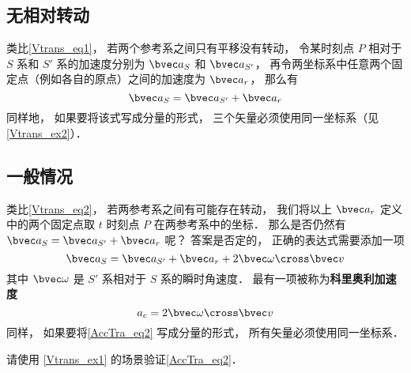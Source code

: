 

\subsection{无相对转动}
类比\autoref{Vtrans_eq1}， 若两个参考系之间只有平移没有转动， 令某时刻点 $P$ 相对于 $S$ 系和 $S'$ 系的加速度分别为 $\bvec a_S$ 和 $\bvec a_{S'}$， 再令两坐标系中任意两个固定点（例如各自的原点）之间的加速度为 $\bvec a_r$， 那么有
\begin{equation}\label{AccTra_eq1}
\bvec a_S = \bvec a_{S'} + \bvec a_r
\end{equation}
同样地， 如果要将该式写成分量的形式， 三个矢量必须使用同一坐标系（见\autoref{Vtrans_ex2}）．

\subsection{一般情况}
类比\autoref{Vtrans_eq2}， 若两参考系之间有可能存在转动， 我们将以上 $\bvec a_r$ 定义中的两个固定点取 $t$ 时刻点 $P$ 在两参考系中的坐标． 那么是否仍然有 $\bvec a_S = \bvec a_{S'} + \bvec a_r$ 呢？ 答案是否定的， 正确的表达式需要添加一项
\begin{equation}\label{AccTra_eq2}
\bvec a_S = \bvec a_{S'} + \bvec a_r + 2 \bvec \omega \cross \bvec v
\end{equation}
其中 $\bvec \omega$ 是 $S'$ 系相对于 $S$ 系的瞬时角速度． 最有一项被称为\textbf{科里奥利加速度}
\begin{equation}
a_c = 2 \bvec \omega \cross \bvec v
\end{equation}
同样， 如果要将\autoref{AccTra_eq2} 写成分量的形式， 所有矢量必须使用同一坐标系．

\begin{exercise}{}
请使用 \autoref{Vtrans_ex1} 的场景验证\autoref{AccTra_eq2}．
\end{exercise}

